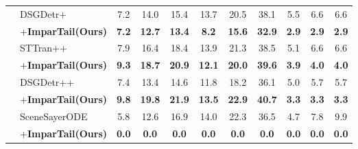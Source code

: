 \begin{table}[!h]
{\begin{tabular}{l|l|ccccccccc}
          \cmidrule(lr){3-11} 
        &        DSGDetr+~\cite{peddi_et_al_scene_sayer_2024} & 7.2 & 14.0 & 15.4 & 13.7 & 20.5 & 38.1 & 5.5 & 6.6 & 6.6  \\ 
        &        \quad+\textbf{ImparTail(Ours)} & \cellcolor{highlightColor} \textbf{7.2} & \cellcolor{highlightColor} \textbf{12.7} & \cellcolor{highlightColor} \textbf{13.4} & \cellcolor{highlightColor} \textbf{8.2} & \cellcolor{highlightColor} \textbf{15.6} & \cellcolor{highlightColor} \textbf{32.9} & \cellcolor{highlightColor} \textbf{2.9} & \cellcolor{highlightColor} \textbf{2.9} & \cellcolor{highlightColor} \textbf{2.9}  \\ 
          \cmidrule(lr){3-11} 
        &        STTran++~\cite{peddi_et_al_scene_sayer_2024} & 7.9 & 16.4 & 18.4 & 13.9 & 21.3 & 38.5 & 5.1 & 6.6 & 6.6  \\ 
        &        \quad+\textbf{ImparTail(Ours)} & \cellcolor{highlightColor} \textbf{9.3} & \cellcolor{highlightColor} \textbf{18.7} & \cellcolor{highlightColor} \textbf{20.9} & \cellcolor{highlightColor} \textbf{12.1} & \cellcolor{highlightColor} \textbf{20.0} & \cellcolor{highlightColor} \textbf{39.6} & \cellcolor{highlightColor} \textbf{3.9} & \cellcolor{highlightColor} \textbf{4.0} & \cellcolor{highlightColor} \textbf{4.0}  \\ 
          \cmidrule(lr){3-11} 
        &        DSGDetr++~\cite{peddi_et_al_scene_sayer_2024} & 7.4 & 13.4 & 14.6 & 11.8 & 18.2 & 36.1 & 5.0 & 5.7 & 5.7  \\ 
        &        \quad+\textbf{ImparTail(Ours)} & \cellcolor{highlightColor} \textbf{9.8} & \cellcolor{highlightColor} \textbf{19.8} & \cellcolor{highlightColor} \textbf{21.9} & \cellcolor{highlightColor} \textbf{13.5} & \cellcolor{highlightColor} \textbf{22.9} & \cellcolor{highlightColor} \textbf{40.7} & \cellcolor{highlightColor} \textbf{3.3} & \cellcolor{highlightColor} \textbf{3.3} & \cellcolor{highlightColor} \textbf{3.3}  \\ 
          \cmidrule(lr){3-11} 
        &        SceneSayerODE~\cite{peddi_et_al_scene_sayer_2024} & 5.8 & 12.6 & 16.9 & 14.0 & 22.3 & 36.5 & 4.7 & 7.8 & 9.9  \\ 
        &        \quad+\textbf{ImparTail(Ours)} & \cellcolor{highlightColor} \textbf{0.0} & \cellcolor{highlightColor} \textbf{0.0} & \cellcolor{highlightColor} \textbf{0.0} & \cellcolor{highlightColor} \textbf{0.0} & \cellcolor{highlightColor} \textbf{0.0} & \cellcolor{highlightColor} \textbf{0.0} & \cellcolor{highlightColor} \textbf{0.0} & \cellcolor{highlightColor} \textbf{0.0} & \cellcolor{highlightColor} \textbf{0.0}  \\ 

\end{tabular}}
\end{table}
